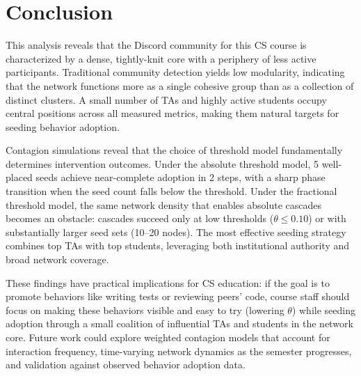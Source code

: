 \documentclass[12pt]{article}
\begin{document}
\section{Conclusion}

This analysis reveals that the Discord community for this CS course is characterized by a dense, tightly-knit core with a periphery of less active participants. Traditional community detection yields low modularity, indicating that the network functions more as a single cohesive group than as a collection of distinct clusters. A small number of TAs and highly active students occupy central positions across all measured metrics, making them natural targets for seeding behavior adoption.

Contagion simulations reveal that the choice of threshold model fundamentally determines intervention outcomes. Under the absolute threshold model, 5 well-placed seeds achieve near-complete adoption in 2 steps, with a sharp phase transition when the seed count falls below the threshold. Under the fractional threshold model, the same network density that enables absolute cascades becomes an obstacle: cascades succeed only at low thresholds ($\theta \leq 0.10$) or with substantially larger seed sets (10--20 nodes). The most effective seeding strategy combines top TAs with top students, leveraging both institutional authority and broad network coverage.

These findings have practical implications for CS education: if the goal is to promote behaviors like writing tests or reviewing peers' code, course staff should focus on making these behaviors visible and easy to try (lowering $\theta$) while seeding adoption through a small coalition of influential TAs and students in the network core. Future work could explore weighted contagion models that account for interaction frequency, time-varying network dynamics as the semester progresses, and validation against observed behavior adoption data.
\end{document}
